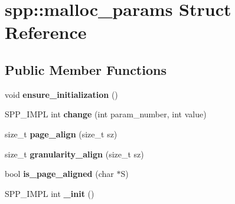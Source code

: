 \hypertarget{structspp_1_1malloc__params}{}\section{spp\+:\+:malloc\+\_\+params Struct Reference}
\label{structspp_1_1malloc__params}
\subsection*{Public Member Functions}
\begin{DoxyCompactItemize}
\item 
void {\bfseries ensure\+\_\+initialization} ()\hypertarget{structspp_1_1malloc__params_ae08c22c2d039c7b6046f17f197d9823d}{}\label{structspp_1_1malloc__params_ae08c22c2d039c7b6046f17f197d9823d}

\item 
S\+P\+P\+\_\+\+I\+M\+PL int {\bfseries change} (int param\+\_\+number, int value)\hypertarget{structspp_1_1malloc__params_a35b0421939e3c47d10b6e80235fd8a78}{}\label{structspp_1_1malloc__params_a35b0421939e3c47d10b6e80235fd8a78}

\item 
size\+\_\+t {\bfseries page\+\_\+align} (size\+\_\+t sz)\hypertarget{structspp_1_1malloc__params_a3a666eca959bb0c002658778232e1e8b}{}\label{structspp_1_1malloc__params_a3a666eca959bb0c002658778232e1e8b}

\item 
size\+\_\+t {\bfseries granularity\+\_\+align} (size\+\_\+t sz)\hypertarget{structspp_1_1malloc__params_a34f3fdc4a7de415e94c653ee26f886a3}{}\label{structspp_1_1malloc__params_a34f3fdc4a7de415e94c653ee26f886a3}

\item 
bool {\bfseries is\+\_\+page\+\_\+aligned} (char $\ast$S)\hypertarget{structspp_1_1malloc__params_a53a84f9ae690731a3b96a2154d479550}{}\label{structspp_1_1malloc__params_a53a84f9ae690731a3b96a2154d479550}

\item 
S\+P\+P\+\_\+\+I\+M\+PL int {\bfseries \+\_\+init} ()\hypertarget{structspp_1_1malloc__params_a4bcc5548a8760e29fecc94e3cec7deec}{}\label{structspp_1_1malloc__params_a4bcc5548a8760e29fecc94e3cec7deec}

\end{DoxyCompactItemize}
